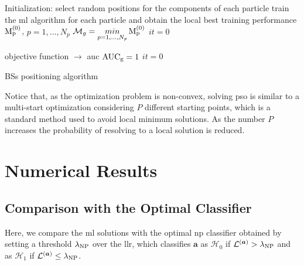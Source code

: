 \documentclass[twocolumns]{IEEEtran}
\begin{document}
 \begin{algorithm}[t]
   \scriptsize

  Initialization: select random positions for the components of each particle\;
  train the \ac{ml} algorithm for each particle and obtain the local best training performance $\rm{M}_p^{(0)}$, $p=1,...,N_p$\;
  $\mathcal{M}_g=\underset{p=1,...,N_p}{min} \, \rm{M}_p^{(0)}$\;
  $it = 0$\;

      
      objective function $\to$ \ac{auc}\;
      $\rm{AUC}_g = 1$\;
      $it = 0$\;
    
\caption{BSs positioning algorithm}
 \end{algorithm}

Notice that, as the optimization problem is non-convex, solving \ac{pso} is similar to a multi-start optimization considering $P$ different starting points, which is a standard method used to avoid local minimum solutions. As the number $P$ increases the probability of resolving to a local solution is reduced.

\section{Numerical Results}\label{sec: nr}
\subsection{Comparison with the Optimal Classifier}
Here, we compare the \ac{ml} solutions with the optimal \ac{np} classifier obtained by setting a threshold $\lambda_{\rm NP}$ over the \ac{llr}, which classifies $\bm{a}$ as $\mathcal{H}_0$ if $\mathcal{L}^{(\bm{a})} > \lambda_{\rm NP}$ and as $\mathcal{H}_1$ if $\mathcal{L}^{(\bm{a})} \le \lambda_{\rm NP}$.
\end{document}
